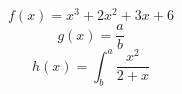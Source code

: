 \documentclass{article}
\begin{document}
	\begin{equation}
		f(x) = x^3 + 2x^2 + 3x + 6
	\end{equation}
	\begin{equation}
		g(x) = \frac{a}{b}
	\end{equation}
	\begin{equation}
		h(x) = \int^a_b \frac{x^2}{2 + x} 
	\end{equation}	
\end{document}
